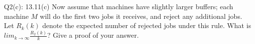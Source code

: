 \begin{problem}
  {Q2(c): 13.11(c)}
  Now assume that machines have slightly larger buffers; each machine $M$ will do the first two jobs it receives, and reject any additional jobs. Let
  $R_k(k)$ denote the expected number of rejected jobs under this rule. What is $lim_{k \rightarrow \infty} \frac{R_2(k)}{k}$? Give a proof of your
  answer.
\end{problem}
